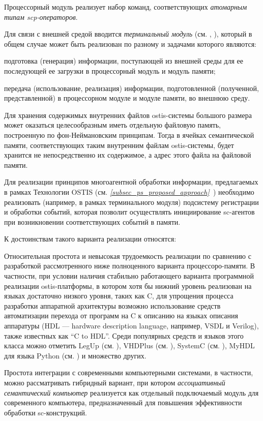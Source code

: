 \begin{textitemize}
	\item Процессорный модуль реализует набор команд, соответствующих \textit{атомарным типам scp-операторов}.
	\item Для связи с внешней средой вводится \textit{терминальный модуль} (см. , ), который в общем случае может быть реализован по разному и задачами которого являются:
	\begin{textitemize}
		\item подготовка (генерация) информации, поступающей из внешней среды для ее последующей ее загрузки в процессорный модуль и модуль памяти;
		\item передача (использование, реализация) информации, подготовленной (полученной, представленной) в процессорном модуле и модуле памяти, во внешнюю среду.
	\end{textitemize}
	\item Для хранения содержимых внутренних файлов ostis-системы большого размера может оказаться целесообразным иметь отдельную файловую память, построенную по фон-Неймановским принципам. Тогда в ячейках семантической памяти, соответствующих таким внутренним файлам ostis-системы, будет хранится не непосредственно их содержимое, а адрес этого файла на файловой памяти.
	\item Для реализации принципов многоагентной обработки информации, предлагаемых в рамках Технологии OSTIS (см. \textit{\ref{subsec_ps_proposed_approach}~}) необходимо реализовать (например, в рамках терминального модуля) подсистему регистрации и обработки событий, которая позволит осуществлять инициирование sc-агентов при возникновении соответствующих событий в памяти.
\end{textitemize}

К достоинствам такого варианта реализации относятся:
\begin{textitemize}
	\item Относительная простота и невысокая трудоемкость реализации по сравнению с разработкой рассмотренного ниже полноценного варианта процессоро-памяти. В частности, при условии наличия стабильно работающего варианта программной реализации ostis-платформы, в котором хотя бы нижний уровень реализован на языках достаточно низкого уровня, таких как C, для упрощения процесса разработки аппаратной архитектуры возможно использование средств автоматизации перехода от программ на C к описанию на языках описания аппаратуры (HDL --- hardware description language, например, VSDL и Verilog), также известных как ``C to HDL''. Среди популярных средств и языков этого класса можно отметить LegUp (см. ), VHDPlus (см. ), SystemC (см. ), MyHDL для языка Python (см. ) и множество других.
	\item Простота интеграции с современными компьютерными системами, в частности, можно рассматривать гибридный вариант, при котором \textit{ассоциативный семантический компьютер} реализуется как отдельный подключаемый модуль для современного компьютера, предназначенный для повышения эффективности обработки sc-конструкций.
\end{textitemize}

